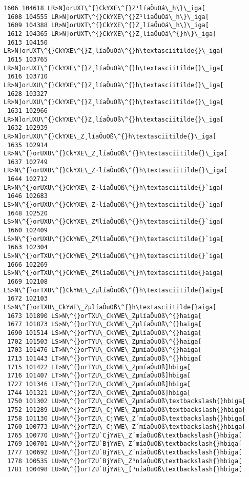 \documentclass[11pt]{article}
\begin{document}
\begin{Verbatim}[commandchars=\\\{\}]
 1606 104618 LR>N]orUXT\^{}CkYXE\^{}Z¹líaÕuOá\_h\}\_iga[
 1608 104555 LR>N]orUXT\^{}CkYXE\^{}Z¹líaÕuOá\_h\}\_iga[
 1609 104388 LR>N]orUXT\^{}CkYXE\^{}Z¸líaÕuOá\_h\}\_iga[
 1612 104365 LR>N]orUXT\^{}CkYXE\^{}Z¸líaÕuOá\^{}h\}\_iga[
 1613 104150 LR>N]orUXT\^{}CkYXE\^{}Z¸líaÕuOá\^{}h\textasciitilde{}\_iga[
 1615 103765 LR>N]orUXT\^{}CkYXE\^{}Z¸líaÕuOà\^{}h\textasciitilde{}\_iga[
 1616 103710 LR>N]orUXU\^{}CkYXE\^{}Z¸líaÕuOà\^{}h\textasciitilde{}\_iga[
 1628 103327 LR>N]orUXU\^{}CkYXE\^{}Z¸líaÕuOß\^{}h\textasciitilde{}\_iga[
 1631 102966 LR>N]orUXU\^{}CkYXE\^{}Z¸líaÔuOß\^{}h\textasciitilde{}\_iga[
 1632 102939 LR>N]orUXU\^{}CkYXE\_Z¸líaÔuOß\^{}h\textasciitilde{}\_iga[
 1635 102914 LR>N\^{}orUXU\^{}CkYXE\_Z¸líaÔuOß\^{}h\textasciitilde{}\_iga[
 1637 102749 LR>N\^{}orUXU\^{}CkYXE\_Z·líaÔuOß\^{}h\textasciitilde{}\_iga[
 1644 102712 LR>N\^{}orUXU\^{}CkYXE\_Z·líaÔuOß\^{}h\textasciitilde{}`iga[
 1646 102683 LS>N\^{}orUXU\^{}CkYXE\_Z·líaÔuOß\^{}h\textasciitilde{}`iga[
 1648 102520 LS>N\^{}orUXU\^{}CkYXE\_Z¶líaÔuOß\^{}h\textasciitilde{}`iga[
 1660 102409 LS>N\^{}orUXU\^{}CkYWE\_Z¶líaÔuOß\^{}h\textasciitilde{}`iga[
 1663 102304 LS>N\^{}orTXU\^{}CkYWE\_Z¶líaÔuOß\^{}h\textasciitilde{}`iga[
 1666 102269 LS>N\^{}orTXU\^{}CkYWE\_Z¶líaÔuOß\^{}h\textasciitilde{}aiga[
 1669 102108 LS>N\^{}orTXU\^{}CkYWE\_ZµlíaÔuOß\^{}h\textasciitilde{}aiga[
 1672 102103 LS>N\^{}orTXU\_CkYWE\_ZµlíaÔuOß\^{}h\textasciitilde{}aiga[
 1673 101890 LS>N\^{}orTXU\_CkYWE\_ZµlíaÔuOß\^{}haiga[
 1677 101873 LS>N\^{}orTYU\_CkYWE\_ZµlíaÔuOß\^{}haiga[
 1690 101514 LS>N\^{}orTYU\_CkYWE\_ZµlíaÓuOß\^{}haiga[
 1702 101503 LS>N\^{}orTYU\_CkYWE\_ZµmíaÓuOß\^{}haiga[
 1703 101476 LT>N\^{}orTYU\_CkYWE\_ZµmíaÓuOß\^{}haiga[
 1713 101443 LT>N\^{}orTYU\_CkYWE\_ZµmíaÓuOß\^{}hbiga[
 1715 101422 LT>N\^{}orTYU\_CkYWE\_ZµmíaÓuOß]hbiga[
 1716 101407 LT>N\^{}orTZU\_CkYWE\_ZµmíaÓuOß]hbiga[
 1727 101346 LT>N\^{}orTZU\_CkYWE\_ZµmíaÓuOß]hbiga[
 1744 101321 LU>N\^{}orTZU\_CkYWE\_ZµmíaÓuOß]hbiga[
 1750 101302 LU>N\^{}orTZU\_CkYWE\_ZµmíaÓuOß\textbackslash{}hbiga[
 1752 101289 LU>N\^{}orTZU\_CjYWE\_ZµmíaÓuOß\textbackslash{}hbiga[
 1758 101130 LU>N\^{}orTZU\_CjYWE\_Z´míaÓuOß\textbackslash{}hbiga[
 1760 100773 LU>N\^{}orTZU\_CjYWE\_Z´míaÒuOß\textbackslash{}hbiga[
 1765 100770 LU>N\^{}orTZU`CjYWE\_Z´míaÒuOß\textbackslash{}hbiga[
 1769 100701 LU>N\^{}orTZU`BjYWE\_Z´míaÒuOß\textbackslash{}hbiga[
 1777 100692 LU>N\^{}orTZU`BjYWE\_Z´níaÒuOß\textbackslash{}hbiga[
 1778 100535 LU>N\^{}orTZU`BjYWE\_Z³níaÒuOß\textbackslash{}hbiga[
 1781 100498 LU>N\^{}orTZU`BjYWE\_[³níaÒuOß\textbackslash{}hbiga[

\end{Verbatim}
\end{document}
